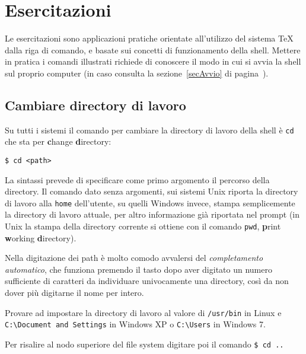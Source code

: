 
\chapter{Esercitazioni}
\label{chapEser}

Le esercitazioni sono applicazioni pratiche orientate all'utilizzo del sistema
\TeX{} dalla riga di comando, e basate sui concetti di funzionamento della
shell. Mettere in pratica i comandi illustrati richiede di conoscere il modo in
cui si avvia la shell sul proprio computer (in caso consulta la
sezione~\ref{secAvvio} di pagina~\pageref{secAvvio}).

\section{Cambiare directory di lavoro}

Su tutti i sistemi il comando per cambiare la directory di lavoro della shell è
\texttt{cd} che sta per \textbf{c}hange \textbf{d}irectory:

\begin{tcolorbox}
\begin{verbatim}
$ cd <path>
\end{verbatim}
\end{tcolorbox}

La sintassi prevede di specificare come primo argomento il percorso della
directory. Il comando dato senza argomenti, sui sistemi Unix riporta la
directory di lavoro alla \texttt{home} dell'utente, su quelli Windows invece,
stampa semplicemente la directory di lavoro attuale, per altro informazione già
riportata nel prompt (in Unix la stampa della directory corrente si ottiene con
il comando \texttt{pwd}, \textbf{p}rint \textbf{w}orking \textbf{d}irectory).

Nella digitazione dei path è molto comodo avvalersi del \emph{completamento
automatico}, che funziona premendo il tasto  dopo aver digitato un
numero sufficiente di caratteri da individuare univocamente una directory, così
da non dover più digitarne il nome per intero.

Provare ad impostare la directory di lavoro al valore di \verb=/usr/bin= in
Linux e \verb=C:\Document and Settings= in Windows XP o \verb=C:\Users= in
Windows 7.

Per risalire al nodo superiore del file system digitare poi il comando
\verb=$ cd ..=

